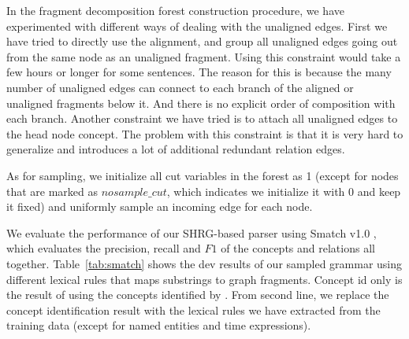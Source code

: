 In the fragment decomposition forest construction procedure, we have experimented with
different ways of dealing with the unaligned edges. First we have tried to
directly use the alignment, and group all unaligned edges going out from the same node as an unaligned fragment. Using this constraint would take a few hours or longer for some sentences.
The reason for this is because the many number of unaligned edges can connect to each branch of the aligned or unaligned fragments below it. And there is no explicit order of composition with each branch. Another constraint we have tried is to attach all unaligned edges to the head node concept. The problem with this constraint is that
it is very hard to generalize and introduces a lot of additional redundant relation edges.


As for sampling, we initialize all cut variables in the forest as 1 (except for nodes that are marked as $nosample\_cut$, which indicates we initialize it with 0 and keep it fixed) and uniformly sample an incoming edge for each node.
\begin{table}
\centering
{}
\caption{Comparisons of different strategies of extracting lexical rules on dev.}
\label{tab:smatch}
\end{table}
We evaluate the performance of our SHRG-based parser using Smatch v1.0 \cite{cai2013smatch}, which
evaluates the precision, recall and $F1$ of the concepts and relations all together.
Table~\ref{tab:smatch} shows the dev results of our sampled grammar using different lexical rules
that maps substrings to graph fragments. Concept id only is the result of using the concepts identified by . From second line, we replace the concept identification result with the lexical rules we have extracted from the training data (except for named entities and time expressions). 
